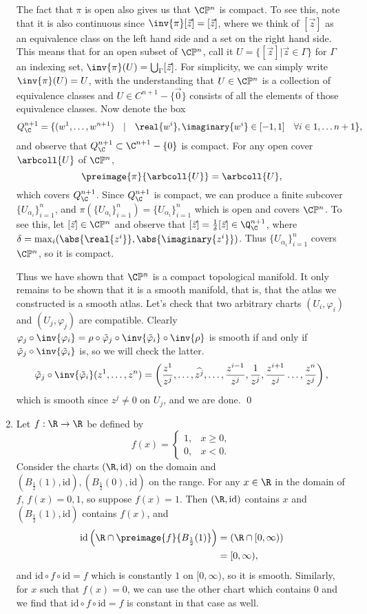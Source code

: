 \documentclass[12pt,letterpaper]{article}
\newcommand{\CP}{\C\mathbb{P}}
\let\temp\phi
\let\phi\varphi
\let\varphi\temp
\newcommand{\id}{\text{id}}
\begin{document}
\begin{enumerate}
\pagebreak
The fact that $\pi$ is open also gives us that $\CP^n$ is compact. To see this, note that it is also continuous since $\inv{\pi}[\vec{z}]=[\vec{z}]$, where we think of $[\vec{z}]$ as an equivalence class on the left hand side and a set on the right hand side. This means that for an open subset of $\CP^n$, call it $U=\{[\vec{z}]| \vec{z}\in\Gamma\}$ for $\Gamma$ an indexing set, $\inv{\pi}(U)=\bigcup_\Gamma[\vec{z}]$. For simplicity, we can simply write $\inv{\pi}(U)=U$, with the understanding that $U\in\CP^n$ is a collection of equivalence classes and $U\in C^{n+1}-\{\vec{0}\}$ consists of all the elements of those equivalence classes. Now denote the box 
$$Q_\C^{n+1}=\{(w^1, \dots, w^{n+1}) \quad|\quad \real{w^i}, \imaginary{w^i} \in [-1,1] \quad \forall i\in1, \dots n+1\},$$
and observe that $Q_\C^{n+1}\subset \C^{n+1}-\{0\}$ is compact. 
For any open cover $\arbcoll{U}$ of $\CP^n$, 
$$\preimage{\pi}{\arbcoll{U}}=\arbcoll{U},$$
which covers $Q_\C^{n+1}$. Since $Q_\C^{n+1}$ is compact, we can produce a finite subcover $\{U_{\alpha_i}\}_{i=1}^n$, and $\pi\left(\{U_{\alpha_i}\}_{i=1}^n\right)=\{U_{\alpha_i}\}_{i=1}^n$ which is open and covers $\CP^n$. To see this, let $[\vec{z}]\in\CP^n$ and observe that $[\vec{z}]=\frac{1}{\delta}[\vec{z}]\in\Q_\C^{n+1}$, where $\delta=\max_i(\abs{\real{z^i}}, \abs{\imaginary{z^i}})$. Thus $\{U_{\alpha_i}\}_{i=1}^n$ covers $\CP^n$, so it is compact. \qedwhite

Thus we have shown that $\CP^n$ is a compact topological manifold. It only remains to be shown that it is a smooth manifold, that is, that the atlas we constructed is a smooth atlas. Let's check that two arbitrary charts $(U_i, \phi_i)$ and $(U_j, \phi_j)$ are compatible. Clearly $\phi_j\circ\inv{\phi_i}=\rho\circ\tilde{\phi}_j\circ\inv{\tilde{\phi}_i}\circ\inv{\rho}$ is smooth if and only if $\tilde{\phi}_j\circ\inv{\tilde{\phi}_i}$ is, so we will check the latter. 
$$\tilde{\phi}_j\circ\inv{\tilde{\phi}_i} (z^1, \dots, z^n)= \left(\frac{z^1}{z^j},\dots,\widehat{z^j},\dots,\frac{z^{i-1}}{z^j}, \frac{1}{z^j}, \frac{z^{i+1}}{z^j} \dots, \frac{z^n}{z^j}\right),$$
which is smooth since $z^j\neq0$ on $U_j$, and we are done. \qed


\item Let $f:\R\to\R$ be defined by 
$$f(x)=
\begin{cases}
1, &x\geq 0,\\
0, &x<0.
\end{cases}$$
Consider the charts $(\R,\id)$ on the domain and $(B_\frac{1}{2}(1), \id), (B_\frac{1}{2}(0), \id)$ on the range. 
For any $x\in\R$ in the domain of $f$, $f(x)=0,1$, so suppose $f(x)=1$. Then $(\R,\id)$ contains $x$ and $(B_\frac{1}{2}(1), \id)$ contains $f(x)$, and 
\begin{align*}
\id\left(\R\cap\preimage{f}{B_\frac{1}{2}(1)}\right) &= \left(\R\cap[0,\infty)\right)\\
&= [0,\infty),
\end{align*}
and $\id\circ f\circ \id =f$ which is constantly $1$ on $[0,\infty)$, so it is smooth. Similarly, for $x$ such that $f(x)=0$, we can use the other chart which contains $0$ and we find that $\id\circ f\circ \id =f$ is constant in that case as well. \qedwhite


\end{enumerate}
\end{document}

